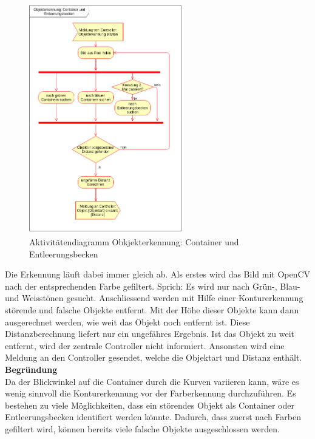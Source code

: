 \begin{figure}[H]%
\centering
\includegraphics[width=0.6\textwidth]{03_Loesungskonzept/pictures/objekterkennung_containers.png}
\caption{Aktivitätendiagramm Obkjekterkennung: Container und Entleerungsbecken}
\label{fig:activityContainer}
\end{figure}
\newpage
Die Erkennung läuft dabei immer gleich ab. Als erstes wird das Bild mit OpenCV nach der entsprechenden Farbe gefiltert. Sprich: Es wird nur nach Grün-, Blau- und Weisstönen gesucht. Anschliessend werden mit Hilfe einer Konturerkennung störende und falsche Objekte entfernt. Mit der Höhe dieser Objekte kann dann ausgerechnet werden, wie weit das Objekt  noch entfernt ist. Diese Distanzberechnung liefert nur ein ungefähres Ergebnis. Ist das Objekt zu weit entfernt, wird der zentrale Controller nicht informiert. Ansonsten wird eine Meldung an den Controller gesendet, welche die Objektart und Distanz enthält.
\\[0.2cm]
\textbf{Begründung}\\[0.2cm]
Da der Blickwinkel auf die Container durch die Kurven variieren kann, wäre es wenig sinnvoll die Konturerkennung vor der Farberkennung durchzuführen. Es bestehen zu viele Möglichkeiten, dass ein störendes Objekt als Container oder Entleerungsbecken identifiert werden könnte. Dadurch, dass zuerst nach Farben gefiltert wird, können bereits viele falsche Objekte ausgeschlossen werden. \\
